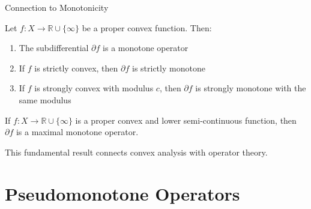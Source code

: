 \documentclass[aspectratio=169,10pt]{beamer}
\begin{document}
\begin{frame}[allowframebreaks]{Connection to Monotonicity}

\begin{theorem}
Let $f : X \to \mathbb{R} \cup \{\infty\}$ be a proper convex function. Then:
\begin{enumerate}
\item The subdifferential $\partial f$ is a monotone operator
\item If $f$ is strictly convex, then $\partial f$ is strictly monotone
\item If $f$ is strongly convex with modulus $c$, then $\partial f$ is strongly monotone with the same modulus
\end{enumerate}
\end{theorem}

\vspace{0.3cm}

\begin{theorem}
If $f : X \to \mathbb{R} \cup \{\infty\}$ is a proper convex and lower semi-continuous function, then $\partial f$ is a maximal monotone operator.
\end{theorem}

This fundamental result connects convex analysis with operator theory.

\end{frame}


\section{Pseudomonotone Operators}
\end{document}

